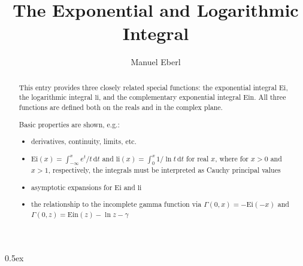 \documentclass[11pt,a4paper]{article}
\begin{document}
\title{The Exponential and Logarithmic Integral}
\author{Manuel Eberl}
\maketitle

\begin{abstract}
This entry provides three closely related special functions: the exponential integral
$\text{Ei}$, the logarithmic integral $\text{li}$, and the complementary exponential
integral $\text{Ein}$. All three functions are defined both on the reals and in the complex plane.

Basic properties are shown, e.g.:
\begin{itemize}
  \item derivatives, continuity, limits, etc.
  \item $\text{Ei}(x) = \int_{-\infty}^x e^t/t\,\text{d}t$ and $\text{li}(x) = \int_0^x 1/\ln t\,\text{d}t$ for 
    real $x$, where for $x>0$ and $x>1$, respectively, the integrals must be interpreted as Cauchy principal values
  \item asymptotic expansions for $\text{Ei}$ and $\text{li}$
  \item the relationship to the incomplete gamma function via $\Gamma(0, x) = -\text{Ei}(-x)$ and $\Gamma(0, z) = \text{Ein}(z) - \ln z - \gamma$
\end{itemize}
\end{abstract}

\tableofcontents

\newpage
\parindent 0pt\parskip 0.5ex



\raggedright



\end{document}
